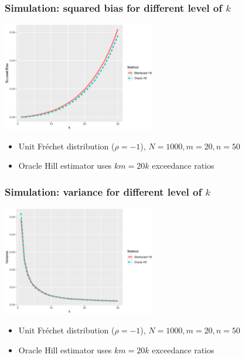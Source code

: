 \documentclass{beamer}
\begin{document}
\begin{frame}
    \frametitle{Simulation: squared bias for different level of $k$}

\begin{center}
    \includegraphics[width = 0.5\textwidth]{Simulation/Frechet_20_50_choice_d_bias.eps} 
\end{center}

\begin{itemize}
    \item Unit Fr\'echet distribution ($\rho=-1$), $N=1000, m=20,n=50$
    \item Oracle Hill estimator uses $km =20k$ exceedance ratios
\end{itemize}
\end{frame}



\begin{frame}
    \frametitle{Simulation: variance for different level of $k$}
    \begin{center}
         \includegraphics[width = 0.5\textwidth]{Simulation/Frechet_20_50_choice_d_variance.eps} 
    \end{center}
    \begin{itemize}
        \item Unit Fr\'echet distribution ($\rho=-1$), $N=1000, m=20,n=50$
        \item Oracle Hill estimator uses $km =20k$ exceedance ratios
    \end{itemize}
\end{frame}
\end{document}
